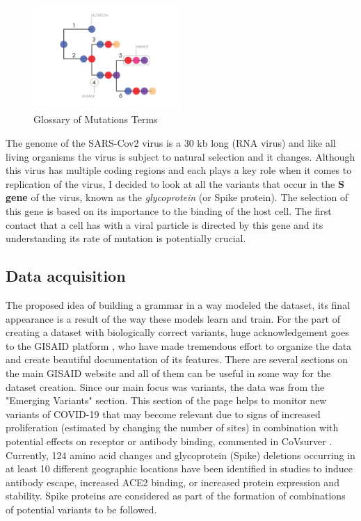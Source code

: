 \documentclass[conference,compsoc]{IEEEtran}
\begin{document}
\begin{figure}[h]
    \centering
    \includegraphics[width=0.5\textwidth]{images/fig2-terminology.jpg}
    \caption{Glossary of Mutations Terms}
    \label{fig2}
\end{figure}

The genome of the SARS-Cov2 virus is a 30 kb long (RNA virus) and like all living organisms the virus is subject to natural selection and it changes. Although this virus has multiple coding regions and each plays a key role when it comes to replication of the virus, I decided to look at all the variants that occur in the \textbf{S gene} of the virus, known as the \textit{glycoprotein} (or Spike protein).
The selection of this gene is based on its importance \cite{ref11} to the binding of the host cell. The first contact that a cell has with a viral particle is directed by this gene and its understanding its rate of mutation is potentially crucial. 


\subsection{Data acquisition}

The proposed idea of building a grammar in a way modeled the dataset, its final appearance is a result of the way these models learn and train. For the part of creating a dataset with biologically correct variants, huge acknowledgement goes to the GISAID platform \cite{ref12}, who have made tremendous effort to organize the data and create beautiful documentation of its features. 
There are several sections on the main GISAID website and all of them can be useful in some way for the dataset creation. Since our main focus was variants, the data was from the "Emerging Variants" section. This section of the page helps to monitor new variants of COVID-19 that may become relevant due to signs of increased proliferation (estimated by changing the number of sites) in combination with potential effects on receptor or antibody binding, commented in CoVsurver \cite{ref13}. Currently, 124 amino acid changes and glycoprotein (Spike) deletions occurring in at least 10 different geographic locations have been identified in studies to induce antibody escape, increased ACE2 \cite{ref14} binding, or increased protein expression and stability. Spike proteins are considered as part of the formation of combinations of potential variants to be followed.
\end{document}
